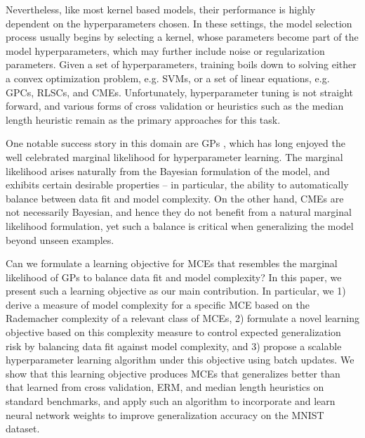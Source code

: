 \documentclass[twoside]{article}
\begin{document}
		
		Nevertheless, like most kernel based models, their performance is highly dependent on the hyperparameters chosen. In these settings, the model selection process usually begins by selecting a kernel, whose parameters become part of the model hyperparameters, which may further include noise or regularization parameters. Given a set of hyperparameters, training boils down to solving either a convex optimization problem, e.g. \glspl{SVM}, or a set of linear equations, e.g. \glspl{GPC}, \glspl{RLSC}, and \glspl{CME}. Unfortunately, hyperparameter tuning is not straight forward, and various forms of cross validation \citep{song2013kernel} or heuristics such as the median length heuristic \citep{damien2017asymptotic, muandet2016kernel} remain as the primary approaches for this task.
		
		
		One notable success story in this domain are \gls{GPs} \citep{rasmussen2006gaussian}, which has long enjoyed the well celebrated marginal likelihood for hyperparameter learning. The marginal likelihood arises naturally from the Bayesian formulation of the model, and exhibits certain desirable properties -- in particular, the ability to automatically balance between data fit and model complexity. On the other hand, \glspl{CME} are not necessarily Bayesian, and hence they do not benefit from a natural marginal likelihood formulation, yet such a balance is critical when generalizing the model beyond unseen examples.
		
		
		Can we formulate a learning objective for \glspl{MCE} that resembles the marginal likelihood of \gls{GPs} to balance data fit and model complexity? In this paper, we present such a learning objective as our main contribution. In particular, we 1) derive a measure of model complexity for a specific \gls{MCE} based on the Rademacher complexity of a relevant class of \glspl{MCE}, 2) formulate a novel learning objective based on this complexity measure to control expected generalization risk by balancing data fit against model complexity, and 3) propose a scalable hyperparameter learning algorithm under this objective using batch updates. We show that this learning objective produces \glspl{MCE} that generalizes better than that learned from cross validation, \gls{ERM}, and median length heuristics on standard benchmarks, and apply such an algorithm to incorporate and learn neural network weights to improve generalization accuracy on the MNIST dataset. %
		
\end{document}
